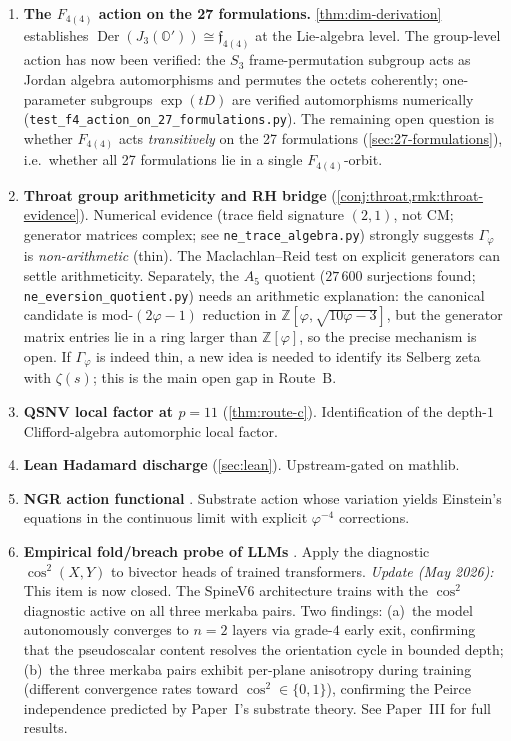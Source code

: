 \documentclass[11pt,a4paper]{article}
\theoremstyle{plain}
\theoremstyle{definition}
\theoremstyle{remark}
\numberwithin{equation}{section}
\providecommand{\Z}{\mathbb{Z}}
\providecommand{\Os}{\mathbb{O}'}
\providecommand{\vp}{\varphi}
\providecommand{\fk}[1]{\mathfrak{#1}}
\DeclareMathOperator{\Der}{Der}
\begin{document}
\begin{enumerate}
  \item \textbf{The $F_{4(4)}$ action on the 27 formulations.}
    \cref{thm:dim-derivation} establishes $\Der(J_3(\Os)) \cong
    \fk{f}_{4(4)}$ at the Lie-algebra level.
    The group-level action has now been verified: the $S_3$
    frame-permutation subgroup acts as Jordan algebra automorphisms
    and permutes the octets coherently; one-parameter subgroups
    $\exp(tD)$ are verified automorphisms numerically
    (\texttt{test\_f4\_action\_on\_27\_formulations.py}).
    The remaining open question is whether $F_{4(4)}$ acts
    \emph{transitively} on the 27 formulations
    (\cref{sec:27-formulations}), i.e.\ whether all 27
    formulations lie in a single $F_{4(4)}$-orbit.
  \item \textbf{Throat group arithmeticity and RH bridge}
    (\cref{conj:throat,rmk:throat-evidence}).
    Numerical evidence (trace field signature $(2,1)$, not CM;
    generator matrices complex; see \texttt{ne\_trace\_algebra.py})
    strongly suggests $\Gamma_\vp$ is \emph{non-arithmetic} (thin).
    The Maclachlan--Reid test \cite{maclachlan-reid2003} on explicit
    generators can settle arithmeticity.  Separately, the $A_5$
    quotient ($27\,600$ surjections found;
    \texttt{ne\_eversion\_quotient.py}) needs an arithmetic explanation:
    the canonical candidate is mod-$(2\vp-1)$ reduction in
    $\Z[\vp, \sqrt{10\vp-3}]$, but the generator matrix entries lie
    in a ring larger than $\Z[\vp]$, so the precise mechanism is open.
    If $\Gamma_\vp$ is indeed thin, a new idea is needed to
    identify its Selberg zeta with $\zeta(s)$; this is the main open
    gap in Route~B.
  \item \textbf{QSNV local factor at $p = 11$}
    (\cref{thm:route-c}). Identification of the depth-$1$
    Clifford-algebra automorphic local factor.
  \item \textbf{Lean Hadamard discharge}
    (\cref{sec:lean}). Upstream-gated on mathlib.
  \item \textbf{NGR action functional}
    \cite{kg-paper}. Substrate action whose variation yields
    Einstein's equations in the continuous limit with explicit
    $\vp^{-4}$ corrections.
  \item \textbf{Empirical fold/breach probe of LLMs}
    \cite{compatibility-tower}. Apply the diagnostic
    $\cos^2(X, Y)$ to bivector heads of trained transformers.
    \emph{Update (May 2026):} This item is now closed.  The SpineV6
    architecture \cite{spine-v6} trains with the $\cos^2$ diagnostic
    active on all three merkaba pairs.  Two findings:
    (a)~the model autonomously converges to $n = 2$ layers via
    grade-$4$ early exit, confirming that the pseudoscalar
    content resolves the orientation cycle in bounded depth;
    (b)~the three merkaba pairs exhibit per-plane anisotropy
    during training (different convergence rates toward
    $\cos^2 \in \{0, 1\}$), confirming the Peirce independence
    predicted by Paper~I's substrate theory.
    See Paper~III \cite[\S 12]{paper-III-monad} for full results.
\end{enumerate}
\end{document}
